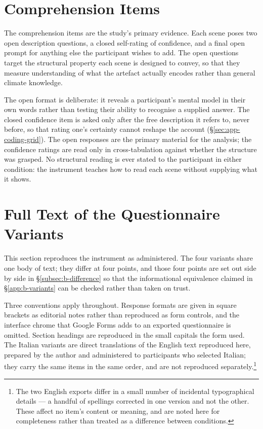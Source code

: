 \section{Comprehension Items}
\label{app:b-comprehension}

The comprehension items are the study's primary evidence. Each scene poses two open description questions, a closed self-rating of confidence, and a final open prompt for anything else the participant wishes to add. The open questions target the structural property each scene is designed to convey, so that they measure understanding of what the artefact actually encodes rather than general climate knowledge.

The open format is deliberate: it reveals a participant's mental model in their own words rather than testing their ability to recognise a supplied answer. The closed confidence item is asked only after the free description it refers to, never before, so that rating one's certainty cannot reshape the account (\S\ref{sec:app-coding-grid}). The open responses are the primary material for the analysis; the confidence ratings are read only in cross-tabulation against whether the structure was grasped. No structural reading is ever stated to the participant in either condition: the instrument teaches how to read each scene without supplying what it shows.

\section{Full Text of the Questionnaire Variants}
\label{app:b-fulltext}

This section reproduces the instrument as administered. The four variants share one body of
text; they differ at four points, and those four points are set out side by side in
\S\ref{subsec:b-difference} so that the informational equivalence claimed in
\S\ref{app:b-variants} can be checked rather than taken on trust.

Three conventions apply throughout. Response formats are given in square brackets as
editorial notes rather than reproduced as form controls, and the interface chrome that
Google Forms adds to an exported questionnaire is omitted. Section headings are reproduced
in the small capitals the form used. The Italian variants are direct translations of the
English text reproduced here, prepared by the author and administered to participants who
selected Italian; they carry the same items in the same order, and are not reproduced
separately.\footnote{The two English exports differ in a small number of incidental
typographical details --- a handful of spellings corrected in one version and not the other.
These affect no item's content or meaning, and are noted here for completeness rather than
treated as a difference between conditions.}

